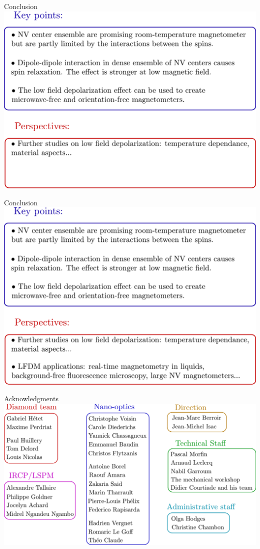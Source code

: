 \documentclass{beamer}
\begin{document}
\begin{frame}{Conclusion}
\centering
\includegraphics[width=\textwidth,height=0.85\textheight,keepaspectratio]{Slide_CCL_f-1}
\end{frame}

\begin{frame}{Conclusion}
\centering
\includegraphics[width=\textwidth,height=0.85\textheight,keepaspectratio]{Slide_CCL_f}
\end{frame}

\begin{frame}{Acknowledgments}
\centering
\includegraphics[width=\textwidth,height=0.85\textheight,keepaspectratio]{Remerciements}
\end{frame}
\end{document}
